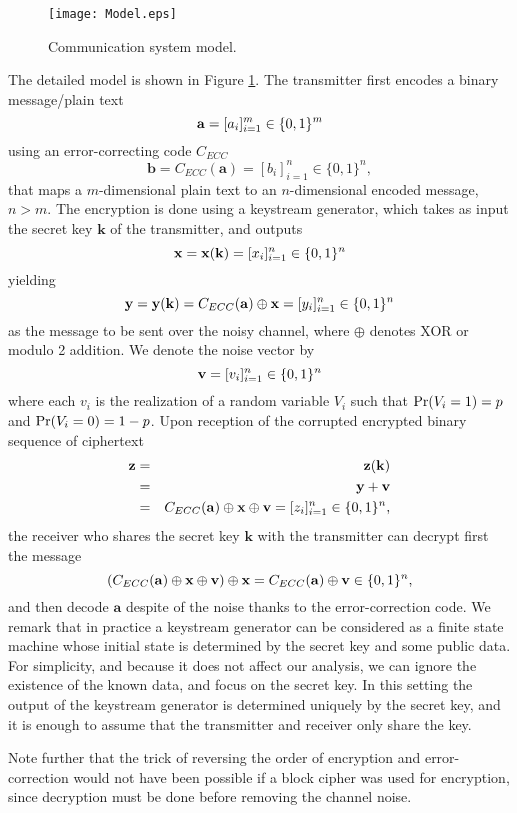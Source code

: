 \documentclass{article}[11pt]
\newcommand{\av}{\mathbf{a}}
\newcommand{\bv}{\mathbf{b}}
\newcommand{\kv}{\mathbf{k}}
\newcommand{\vv}{\mathbf{v}}
\newcommand{\xv}{\mathbf{x}}
\newcommand{\yv}{\mathbf{y}}
\newcommand{\zv}{\mathbf{z}}
\begin{document}
\begin{figure}[htb]
\leavevmode
\begin{center}
\texttt{[image: Model.eps]}
\caption{Communication system model.}
\label{fig:figure-1}
\end{center}
\end{figure}
The detailed model is shown in Figure \ref{fig:figure-1}.
The transmitter first encodes a binary message/plain text
\[
{\bf a}=[a_i]_{i=1}^m \in \{0,1\}^m
\]
using an error-correcting code $C_{ECC}$
\[
\bv=C_{ECC}(\av)=[b_i]_{i=1}^n\in\{0,1\}^n,
\]
that maps a $m$-dimensional plain text to an $n$-dimensional
encoded message, $n>m$.
The encryption is done using a keystream generator, which takes
as input the secret key $\kv$ of the transmitter, and outputs
\[
{\bf x}=\xv(\kv)=[x_i]_{i=1}^n\in\{0,1\}^n
\]
yielding
\begin{equation}\label{eq:y}
\yv= \yv(\kv)=C_{ECC}(\av)\oplus {\bf x}=[y_i]_{i=1}^n\in\{0,1\}^n
\end{equation}
as the message to be sent over the noisy channel, where
$\oplus$ denotes XOR or modulo 2 addition. We denote the noise
vector by
\[
{\bf v}=[v_i]_{i=1}^{n}\in\{0,1\}^n
\]
where each $v_i$ is the realization of a random variable $V_i$
such that ${\rm Pr}(V_i=1) = p$ and ${\rm Pr}(V_i=0) =1-p$.
Upon reception of the corrupted encrypted binary sequence of ciphertext
\begin{eqnarray*}
\zv &=& \zv(\kv) \\
    &=& \yv + \vv \\
    &=& C_{ECC}(\av)\oplus {\bf x}\oplus \vv=[z_i]_{i=1}^n \in\{0,1\}^n,
\end{eqnarray*}
the receiver who shares the secret key $\kv$ with the transmitter can decrypt
first the message
\[
(C_{ECC}(\av)\oplus {\bf x}\oplus \vv) \oplus \xv
= C_{ECC}(\av)\oplus \vv \in\{0,1\}^n,
\]
and then decode $\av$ despite of the noise thanks to the error-correction code.
We remark that in practice a keystream generator can be considered as a finite
state machine whose initial state is determined by the secret key and some public
data. For simplicity, and because it does not affect our analysis, we can ignore
the existence of the known data, and focus on the secret key. In this setting the
output of the keystream generator is determined uniquely by the secret key, and
it is enough to assume that the transmitter and receiver only share the key.

Note further that the trick of reversing the order of encryption and error-correction
would not have been possible if a block cipher was used for encryption, since decryption
must be done before removing the channel noise.
\end{document}
